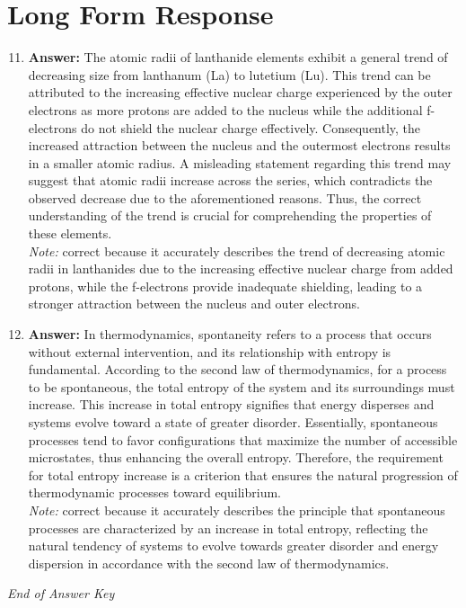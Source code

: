 \documentclass[12pt]{article}
\begin{document}
\section*{Long Form Response}
\begin{enumerate}[label=\arabic*.]
\setcounter{enumi}{10}
\item \textbf{Answer:} The atomic radii of lanthanide elements exhibit a general trend of decreasing size from lanthanum (La) to lutetium (Lu). This trend can be attributed to the increasing effective nuclear charge experienced by the outer electrons as more protons are added to the nucleus while the additional f-electrons do not shield the nuclear charge effectively. Consequently, the increased attraction between the nucleus and the outermost electrons results in a smaller atomic radius. A misleading statement regarding this trend may suggest that atomic radii increase across the series, which contradicts the observed decrease due to the aforementioned reasons. Thus, the correct understanding of the trend is crucial for comprehending the properties of these elements.
\\ \textit{Note:} correct because it accurately describes the trend of decreasing atomic radii in lanthanides due to the increasing effective nuclear charge from added protons, while the f-electrons provide inadequate shielding, leading to a stronger attraction between the nucleus and outer electrons.
\item \textbf{Answer:} In thermodynamics, spontaneity refers to a process that occurs without external intervention, and its relationship with entropy is fundamental. According to the second law of thermodynamics, for a process to be spontaneous, the total entropy of the system and its surroundings must increase. This increase in total entropy signifies that energy disperses and systems evolve toward a state of greater disorder. Essentially, spontaneous processes tend to favor configurations that maximize the number of accessible microstates, thus enhancing the overall entropy. Therefore, the requirement for total entropy increase is a criterion that ensures the natural progression of thermodynamic processes toward equilibrium.
\\ \textit{Note:} correct because it accurately describes the principle that spontaneous processes are characterized by an increase in total entropy, reflecting the natural tendency of systems to evolve towards greater disorder and energy dispersion in accordance with the second law of thermodynamics.
\end{enumerate}

\vfill
\noindent\textit{End of Answer Key}
\end{document}
